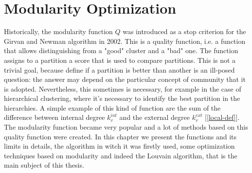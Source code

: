 \section{Modularity Optimization}
Historically, the modularity function $Q$ was introduced as a stop criterion for the Girvan and Newman algorithm in 2002. This is a quality function, i.e. a function that allows distinguishing from a "good" cluster and a "bad" one. The function assigns to a partition a score that is used to compare partitions. This is not a trivial goal, because define if a partition is better than another is an ill-posed question: the answer may depend on the particular concept of community that it is adopted. Nevertheless, this sometimes is necessary, for example in the case of hierarchical clustering, where it's necessary to identify the best partition in the hierarchies. A simple example of this kind of function are the sum of the difference between internal degree $k_v^{int}$ and the external degree $k_v^{ext}$ [\ref{local-def}]. \\
The modularity function became very popular and a lot of methods based on this quality function were created.
In this chapter we present the functions and its limits in details, the algorithm in witch it was firstly used, some optimization techniques based on modularity and indeed the Louvain algorithm, that is the main subject of this thesis.
